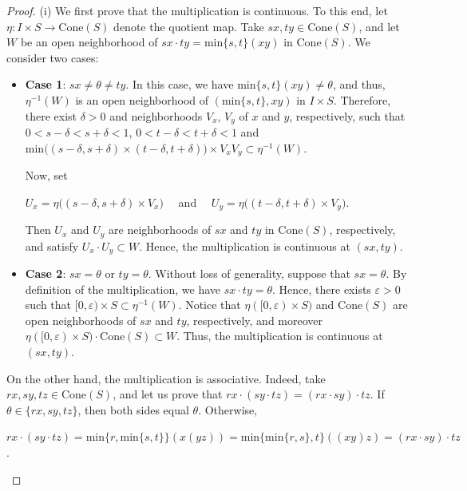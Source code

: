 \documentclass[10pt,a4paper]{amsart}
\begin{document}
	\begin{proof}
		
		(i) We first prove that the multiplication is continuous. To this end, let $\eta: I\times S\rightarrow \mathrm{Cone}(S)$ denote the quotient map. Take $sx, ty\in \mathrm{Cone}(S)$, and let $W$ be an open neighborhood of $sx\cdot ty=\text{min}\{s,t\}(xy)$ in $\mathrm{Cone}(S)$. We consider two cases:
		\begin{itemize}
			\item \textbf{Case 1}: $sx\neq \theta\neq ty$. In this case, we have $\text{min}\{s,t\}(xy)\neq \theta$, and thus, $\eta^{-1}(W)$ is an open neighborhood of $(\text{min}\{s,t\}, xy)$ in $I\times S$. Therefore, there exist $\delta>0$ and neighborhoods $V_x$, $V_y$ of $x$ and $y$, respectively, such that $0<s-\delta<s+\delta<1$, $0<t-\delta<t+\delta<1$ and $\text{min}\big((s-\delta,s+\delta)\times (t-\delta,t+\delta)\big)\times V_xV_y\subset \eta^{-1}(W)$. 
			
			Now, set
			
			\begin{center}
				$U_x=\eta\big((s-\delta,s+\delta)\times V_x\big)\quad$ and $\quad U_y=\eta\big((t-\delta,t+\delta)\times V_y\big)$.
			\end{center}
			
			Then $U_x$ and $U_y$ are neighborhoods of $sx$ and $ty$ in $\mathrm{Cone}(S)$, respectively, and satisfy $U_x\cdot U_y\subset W$. Hence, the multiplication is continuous at $(sx,ty)$.
			
			\item \textbf{Case 2}: $sx=\theta$ or $ty=\theta$. Without loss of generality, suppose that $sx=\theta$. By definition of the multiplication, we have $sx\cdot ty=\theta$. Hence, there exists $\varepsilon > 0$ such that $[0,\varepsilon)\times S\subset \eta^{-1}(W)$. Notice that $\eta([0,\varepsilon)\times S)$ and $\mathrm{Cone}(S)$ are open neighborhoods of $sx$ and $ty$, respectively, and moreover $\eta([0,\varepsilon)\times S)\cdot \mathrm{Cone}(S)\subset W$. Thus, the multiplication is continuous at $(sx,ty)$.
		\end{itemize}
		
		
		
		On the other hand, the multiplication is associative. Indeed, take $rx,sy,tz\in \mathrm{Cone}(S)$, and let us prove that $rx\cdot(sy\cdot tz)=(rx\cdot sy)\cdot tz$. If $\theta \in \{rx, sy, tz\}$, then both sides equal $\theta$. Otherwise,
		\begin{center}
			$rx\cdot(sy\cdot tz)=\mbox{min}\{r,\mbox{min}\{s,t\}\}(x(yz))=\mbox{min}\{\mbox{min}\{r,s\},t\}((xy)z)=(rx\cdot sy)\cdot tz$.  
		\end{center}
		

\end{proof}
\end{document}
